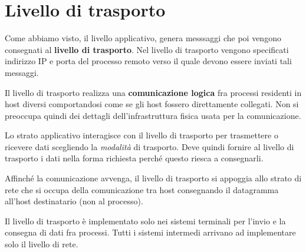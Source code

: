 \chapter{Livello di trasporto}
Come abbiamo visto, il livello applicativo, genera messsaggi che poi vengono consegnati al
\textbf{livello di trasporto}. Nel livello di trasporto vengono specificati indirizzo IP e porta
del processo remoto verso il quale devono essere inviati tali messaggi.

Il livello di trasporto realizza una \textbf{comunicazione logica} fra processi residenti in host
diversi comportandosi come se gli host fossero direttamente collegati. Non si preoccupa quindi dei
dettagli dell'infrastruttura fisica usata per la comunicazione.

Lo strato applicativo interagisce con il livello di trasporto per trasmettere o ricevere dati
scegliendo la \emph{modalità} di trasporto. Deve quindi fornire al livello di trasporto i dati
nella forma richiesta perché questo riesca a consegnarli.

Affinché la comunicazione avvenga, il livello di trasporto si appoggia allo strato di rete che si
occupa della comunicazione tra host consegnando il datagramma all'host destinatario (non al
processo).

Il livello di trasporto è implementato solo nei sistemi terminali per l'invio e la consegna di dati
fra processi. Tutti i sistemi intermedi arrivano ad implementare solo il livello di rete.

